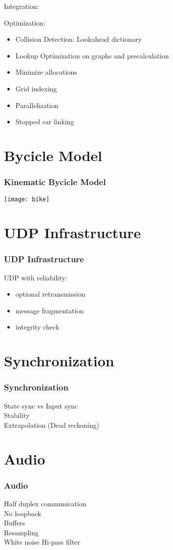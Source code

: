 \documentclass{beamer}
\begin{document}
\begin{frame}
	Integration:

\end{frame}

\begin{frame}
	Optimization:
	\begin{itemize}
		\item Collision Detection: Lookahead dictionary
		\item Lookup Optimization on graphs and precalculation
		\item Minimize allocations
		\item Grid indexing
		\item Parallelization
		\item Stopped car linking
	\end{itemize}
\end{frame}

\section{Bycicle Model}
\begin{frame}
	\frametitle{Kinematic Bycicle Model}
\texttt{[image: bike]}
\end{frame}


\section{UDP Infrastructure}
\begin{frame}
	\frametitle{UDP Infrastructure}
UDP with reliability:
\begin{itemize}
	\item optional retransmission
	\item message fragmentation
	\item integrity check
\end{itemize}
\end{frame}


\section{Synchronization}
\begin{frame}
	\frametitle{Synchronization}
State sync vs Input sync \\
Stability \\
Extrapolation (Dead reckoning)\\
\end{frame}

\section{Audio}
\begin{frame}
	\frametitle{Audio}
Half duplex communication \\
No loopback \\
Buffers \\
Resampling \\
White noise 
Hi-pass filter \\
\end{frame}
\end{document}
